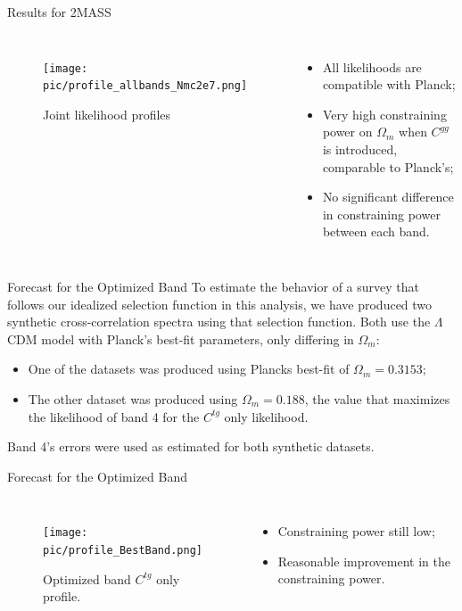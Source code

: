 \documentclass[serif, aspectratio=169]{beamer}
\begin{document}
\begin{frame}{Results for 2MASS}
    \begin{columns}
        \begin{figure}
            \centering
            \texttt{[image: pic/profile\_allbands\_Nmc2e7.png]}
            \caption{Joint likelihood profiles}
            \label{fig:prof_ctg_cgg}
        \end{figure}
        \begin{itemize}
            \item All likelihoods are compatible with Planck;
            \item Very high constraining power on $\Omega_m$ when $C^{gg}$ is introduced, comparable to Planck's;
            \item No significant difference in constraining power between each band.
        \end{itemize}
    \end{columns}
\end{frame}

\begin{frame}{Forecast for the Optimized Band}
    To estimate the behavior of a survey that follows our idealized selection function in this analysis, we have produced two synthetic cross-correlation spectra using that selection function. Both use the $\Lambda$CDM model with Planck's best-fit parameters, only differing in $\Omega_m$:

    \begin{itemize}
        \item One of the datasets was produced using Plancks best-fit of $\Omega_m=0.3153$;
        \item The other dataset was produced using $\Omega_m=0.188$, the value that maximizes the likelihood of band 4 for the $C^{tg}$ only likelihood.
    \end{itemize}

    Band 4's errors were used as estimated for both synthetic datasets.
\end{frame}

\begin{frame}{Forecast for the Optimized Band}
    \begin{columns}
        \begin{figure}
            \centering
            \texttt{[image: pic/profile\_BestBand.png]}
            \caption{Optimized band $C^{tg}$ only profile.}
            \label{fig:profile_BestBand}
        \end{figure}

        \begin{itemize}
            \item Constraining power still low;
            \item Reasonable improvement in the constraining power.
        \end{itemize}
    \end{columns}
\end{frame}
\end{document}
